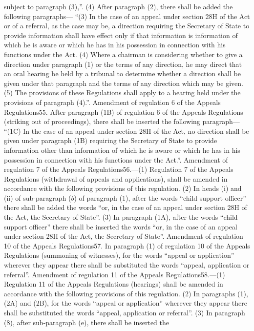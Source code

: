 \documentclass[a4paper]{article}
\begin{document}
subject to paragraph (3),”.
(4) After paragraph (2), there shall be added the following paragraphs—
“(3) In the case of an appeal under section 28H of the Act or of a referral, as
the case may be, a direction requiring the Secretary of State to provide
information shall have effect only if that information is information of which
he is aware or which he has in his possession in connection with his functions
under the Act.
(4) Where a chairman is considering whether to give a direction under paragraph
(1) or the terms of any direction, he may direct that an oral hearing be held by
a tribunal to determine whether a direction shall be given under that paragraph
and the terms of any direction which may be given.
(5) The provisions of these Regulations shall apply to a hearing held under the
provisions of paragraph (4).”.
Amendment of regulation 6 of the Appeals Regulations55. After paragraph (1B) of
regulation 6 of the Appeals Regulations (striking out of proceedings), there
shall be inserted the following paragraph—
“(1C) In the case of an appeal under section 28H of the Act, no direction shall
be given under paragraph (1B) requiring the Secretary of State to provide
information other than information of which he is aware or which he has in his
possession in connection with his functions under the Act.”.
Amendment of regulation 7 of the Appeals Regulations56.—(1) Regulation 7 of the
Appeals Regulations (withdrawal of appeals and applications), shall be amended
in accordance with the following provisions of this regulation.
(2) In heads (i) and (ii) of sub-paragraph ($b$) of paragraph (1), after the words
“child support officer” there shall be added the words “or, in the case of an
appeal under section 28H of the Act, the Secretary of State”.
(3) In paragraph (1A), after the words “child support officer” there shall be
inserted the words “or, in the case of an appeal under section 28H of the Act,
the Secretary of State”.
Amendment of regulation 10 of the Appeals Regulations57. In paragraph (1) of
regulation 10 of the Appeals Regulations (summoning of witnesses), for the words
“appeal or application” wherever they appear there shall be substituted the
words “appeal, application or referral”.
Amendment of regulation 11 of the Appeals Regulations58.—(1) Regulation 11 of
the Appeals Regulations (hearings) shall be amended in accordance with the
following provisions of this regulation.
(2) In paragraphs (1), (2A) and (2B), for the words “appeal or application”
wherever they appear there shall be substituted the words “appeal, application
or referral”.
(3) In paragraph (8), after sub-paragraph (e), there shall be inserted the
\end{document}

